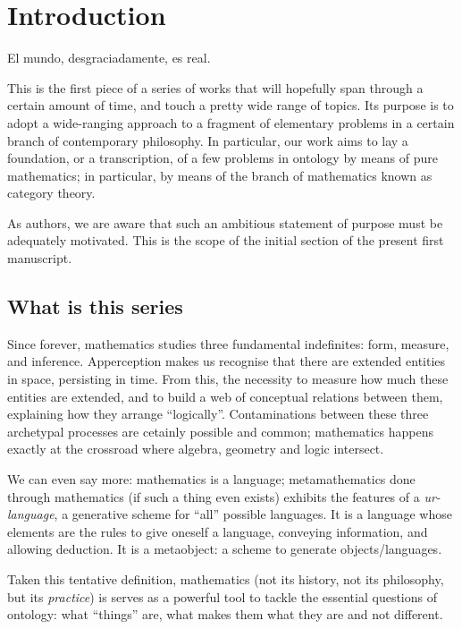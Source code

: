 \section{Introduction}
\epigraph{El mundo, desgraciadamente, es real.}{\cite{confutacion}}
This is the first piece of a series of works that will hopefully span through a certain amount of time, and touch a pretty wide range of topics. Its purpose is to adopt a wide-ranging approach to a fragment of elementary problems in a certain branch of contemporary philosophy. In particular, our work aims to lay a foundation, or a transcription, of a few problems in ontology by means of pure mathematics; in particular, by means of the branch of mathematics known as category theory.

As authors, we are aware that such an ambitious statement of purpose must be adequately motivated. This is the scope of the initial section of the present first manuscript.
\subsection{What is this series}

Since forever, mathematics studies three fundamental indefinites: form, measure, and inference. Apperception makes us recognise that there are extended entities in space, persisting in time. From this, the necessity to measure how much these entities are extended, and to build a web of conceptual relations between them, explaining how they arrange ``logically''.
Contaminations between these three archetypal processes are cetainly possible and common; mathematics happens exactly at the crossroad where algebra, geometry and logic intersect.

We can even say more: mathematics is a language; metamathematics done through mathematics (if such a thing even exists) exhibits the features of a \emph{ur-language}, a generative scheme for ``all'' possible languages. It is a language whose elements are the rules to give oneself a language, conveying information, and allowing deduction. It is a metaobject: a scheme to generate objects/languages.

Taken this tentative definition, mathematics (not its history, not its philosophy, but its \emph{practice}) is serves as a powerful tool to tackle the essential questions of ontology: what ``things'' are, what makes them what they are and not different.

